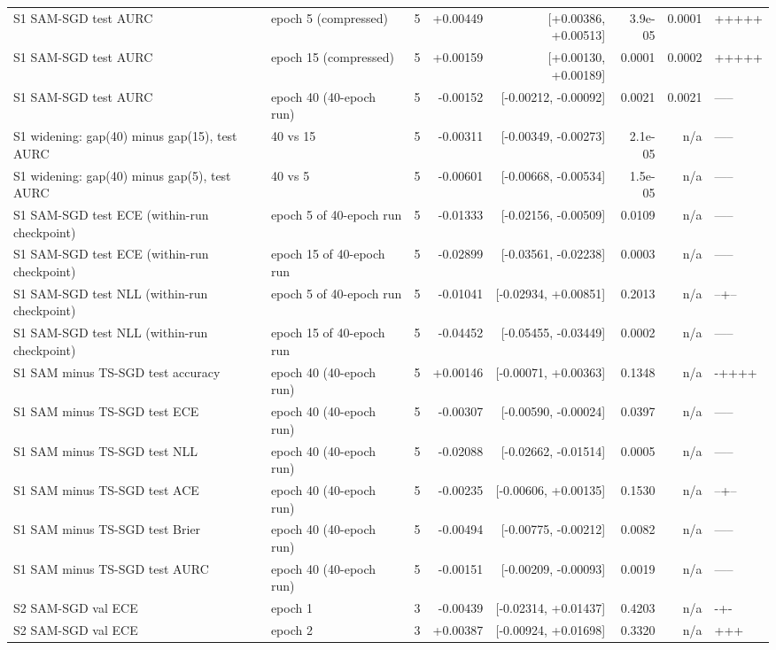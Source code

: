 \documentclass[11pt,letterpaper]{article}
\begin{document}
{\begin{longtable}{>{\raggedright\arraybackslash}p{3.6cm}lrrrrrl}
S1 SAM-SGD test AURC & epoch 5 (compressed) & 5 & +0.00449 & [+0.00386, +0.00513] & 3.9e-05 & 0.0001 & +++++ \\
S1 SAM-SGD test AURC & epoch 15 (compressed) & 5 & +0.00159 & [+0.00130, +0.00189] & 0.0001 & 0.0002 & +++++ \\
S1 SAM-SGD test AURC & epoch 40 (40-epoch run) & 5 & -0.00152 & [-0.00212, -0.00092] & 0.0021 & 0.0021 & ----- \\
S1 widening: gap(40) minus gap(15), test AURC & 40 vs 15 & 5 & -0.00311 & [-0.00349, -0.00273] & 2.1e-05 & n/a & ----- \\
S1 widening: gap(40) minus gap(5), test AURC & 40 vs 5 & 5 & -0.00601 & [-0.00668, -0.00534] & 1.5e-05 & n/a & ----- \\
S1 SAM-SGD test ECE (within-run checkpoint) & epoch 5 of 40-epoch run & 5 & -0.01333 & [-0.02156, -0.00509] & 0.0109 & n/a & ----- \\
S1 SAM-SGD test ECE (within-run checkpoint) & epoch 15 of 40-epoch run & 5 & -0.02899 & [-0.03561, -0.02238] & 0.0003 & n/a & ----- \\
S1 SAM-SGD test NLL (within-run checkpoint) & epoch 5 of 40-epoch run & 5 & -0.01041 & [-0.02934, +0.00851] & 0.2013 & n/a & --+-- \\
S1 SAM-SGD test NLL (within-run checkpoint) & epoch 15 of 40-epoch run & 5 & -0.04452 & [-0.05455, -0.03449] & 0.0002 & n/a & ----- \\
S1 SAM minus TS-SGD test accuracy & epoch 40 (40-epoch run) & 5 & +0.00146 & [-0.00071, +0.00363] & 0.1348 & n/a & -++++ \\
S1 SAM minus TS-SGD test ECE & epoch 40 (40-epoch run) & 5 & -0.00307 & [-0.00590, -0.00024] & 0.0397 & n/a & ----- \\
S1 SAM minus TS-SGD test NLL & epoch 40 (40-epoch run) & 5 & -0.02088 & [-0.02662, -0.01514] & 0.0005 & n/a & ----- \\
S1 SAM minus TS-SGD test ACE & epoch 40 (40-epoch run) & 5 & -0.00235 & [-0.00606, +0.00135] & 0.1530 & n/a & --+-- \\
S1 SAM minus TS-SGD test Brier & epoch 40 (40-epoch run) & 5 & -0.00494 & [-0.00775, -0.00212] & 0.0082 & n/a & ----- \\
S1 SAM minus TS-SGD test AURC & epoch 40 (40-epoch run) & 5 & -0.00151 & [-0.00209, -0.00093] & 0.0019 & n/a & ----- \\
S2 SAM-SGD val ECE & epoch 1 & 3 & -0.00439 & [-0.02314, +0.01437] & 0.4203 & n/a & -+- \\
S2 SAM-SGD val ECE & epoch 2 & 3 & +0.00387 & [-0.00924, +0.01698] & 0.3320 & n/a & +++ \\

\end{longtable}}
\end{document}
